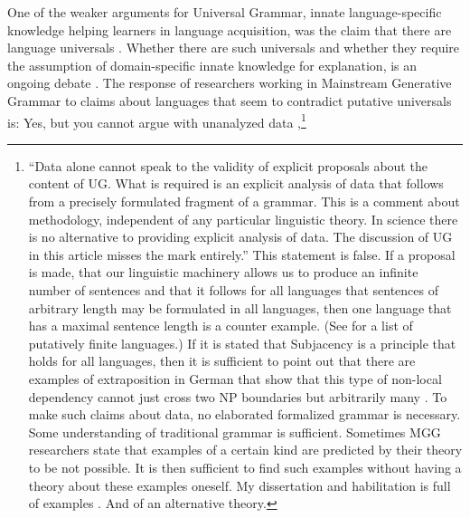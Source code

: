 \documentclass[output=paper,colorlinks,citecolor=brown]{langscibook}
\begin{document}
One of the weaker arguments for Universal Grammar, innate language-specific knowledge helping
learners in language acquisition, was the claim that there are language
universals \parencites[--238]{Pinker94a}[]{Chomsky98a-u}. Whether there are such
universals and whether they require the assumption of domain-specific innate knowledge for
explanation, is an ongoing debate \parencites{Hawkins88a-ed,PF2000a,EL2009a,EL2009b}[Section~13.1]{MuellerGT-Eng5}. The response of researchers
working in Mainstream Generative Grammar to claims about languages that seem to contradict
putative universals is: Yes, but you cannot argue with unanalyzed data \citep[]{Freidin2009a},\footnote{
``Data alone cannot speak to the validity of explicit proposals
about the content of UG. What is required is an explicit analysis of data that follows from a
precisely formulated fragment of a grammar. This is a comment about methodology, independent of any
particular linguistic theory. In science there is no alternative to providing explicit analysis of
data. The discussion of UG in this article misses the mark entirely.''
This statement is false. If a proposal is made, that our linguistic machinery allows us to produce an
infinite number of sentences and that it follows for all languages that sentences of arbitrary
length may be formulated in all languages, then one language that has a maximal sentence length is a
counter example. (See  for a list of putatively finite languages.) If it is stated that Subjacency is a principle that holds for all languages, then
it is sufficient to point out that there are examples of extraposition in German that show that this
type of non-local dependency cannot just cross two NP boundaries but arbitrarily many \parencites{Mueller2004d}[Section~13.1.5]{MuellerGT-Eng5}. To make such
claims about data, no elaborated formalized grammar is necessary. Some understanding of traditional
grammar is sufficient. Sometimes MGG researchers state that examples of a
certain kind are predicted by their theory to be not possible. It is then sufficient to find such
examples without having a theory about these examples oneself. My dissertation and habilitation is
full of examples \citep{Mueller99a,Mueller2002b}. And of an alternative theory.
}
\end{document}
